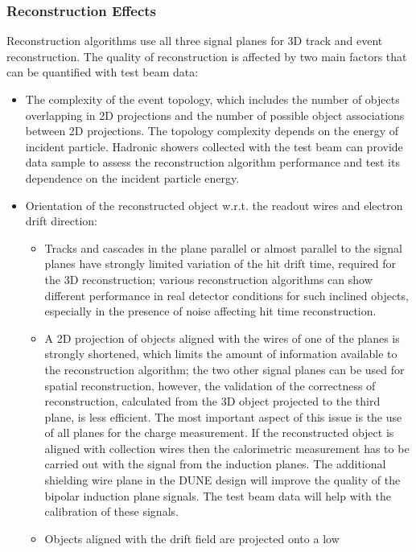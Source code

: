 
\subsubsection{Reconstruction Effects}
\label{sec_reco}

Reconstruction algorithms use all three signal planes for 3D track and event reconstruction. The quality of reconstruction is affected by two main factors that can be quantified with test beam data:
\begin{itemize}
\item The complexity of the event topology, which includes the number of objects overlapping in 2D projections and the number of possible object associations between 2D projections. The topology complexity depends on the energy of incident particle. Hadronic showers collected with the test beam can provide data sample to assess the reconstruction algorithm performance and test its dependence on the incident particle energy.
\item Orientation of the reconstructed object w.r.t. the readout wires and electron drift direction:
\begin{itemize}
\item Tracks and cascades in the plane parallel or almost parallel to the signal planes have strongly limited variation of the hit drift time, required for the 3D reconstruction; various reconstruction algorithms can show different performance in real detector conditions for such inclined objects, especially in the presence of noise affecting hit time reconstruction.
\item A 2D projection of objects aligned with the wires of one of the planes is strongly shortened, which limits the amount of information available to the reconstruction algorithm; the two other signal planes can be used for spatial reconstruction, however, the validation of the correctness of reconstruction, calculated from the 3D object projected to the third plane, is less efficient.
The most important aspect of this issue is the use of all planes for the charge measurement. If the reconstructed object is aligned with collection wires then the calorimetric measurement has to be carried out with the signal from the induction planes. The additional shielding wire plane in the DUNE design will improve the quality of the bipolar induction plane signals.  The test beam 
data will help with the calibration of these signals.
\item Objects aligned with the drift field are projected onto a low

\end{itemize}
\end{itemize}

